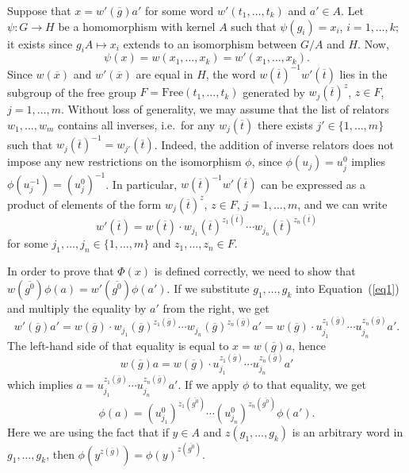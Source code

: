 \documentclass{article}
\begin{document}
Suppose that \( x = w'(\overline{g})a' \) for some word \( w'(t_1, \dots, t_k) \) and \( a' \in A \).
Let \( \psi : G \to H \) be a homomorphism with kernel \( A \) such that \( \psi(g_i) = x_i \), \( i = 1, \dots, k \);
it exists since \( g_iA \mapsto x_i \) extends to an isomorphism between \( G/A \) and \( H \). Now,
\[ \psi(x) = w(x_1, \dots, x_k) = w'(x_1, \dots, x_k). \]
Since \( w(\overline{x}) \) and \( w'(\overline{x}) \) are equal in \( H \), the word \( w(\overline{t})^{-1}w'(\overline{t}) \)
lies in the subgroup of the free group \( F = \mathrm{Free}(t_1, \dots, t_k) \) generated by \( w_j(\overline{t})^z \), \( z \in F \), \( j = 1, \dots, m \).
Without loss of generality, we may assume that the list of relators \( w_1, \dots, w_m \) contains all inverses, i.e.\ for any \( w_j(\overline{t}) \)
there exists \( j' \in \{ 1, \dots, m \} \) such that \( w_j(\overline{t})^{-1} = w_{j'}(\overline{t}) \). Indeed, the addition of inverse
relators does not impose any new restrictions on the isomorphism \( \phi \), since \( \phi(u_j) = u_j^0 \) implies \( \phi(u_j^{-1}) = (u_j^0)^{-1} \).
In particular, \( w(\overline{t})^{-1}w'(\overline{t}) \) can be expressed as a product of elements of the form
\( w_j(\overline{t})^z \), \( z \in F \), \( j = 1, \dots, m \), and we can write
\begin{equation}\label{eq1}
	w'(\overline{t}) = w(\overline{t}) \cdot w_{j_1}(\overline{t})^{z_1(\overline{t})} \cdots w_{j_n}(\overline{t})^{z_n(\overline{t})}
\end{equation}
for some \( j_1, \dots, j_n \in \{ 1, \dots, m \} \) and \( z_1, \dots, z_n \in F \).

In order to prove that \( \Phi(x) \) is defined correctly, we need to show that \( w(\overline{g^0})\phi(a) = w'(\overline{g^0})\phi(a') \).
If we substitute \( g_1, \dots, g_k \) into Equation~(\ref{eq1}) and multiply the equality by \( a' \) from the right, we get
\[ w'(\overline{g})a' = w(\overline{g}) \cdot w_{j_1}(\overline{g})^{z_1(\overline{g})} \cdots w_{j_n}(\overline{g})^{z_n(\overline{g})}a' =
	w(\overline{g}) \cdot u_{j_1}^{z_1(\overline{g})} \cdots u_{j_n}^{z_n(\overline{g})}a'.  \]
The left-hand side of that equality is equal to \( x = w(\overline{g})a \), hence
\[ w(\overline{g})a = w(\overline{g}) \cdot u_{j_1}^{z_1(\overline{g})} \cdots u_{j_n}^{z_n(\overline{g})}a' \]
which implies \( a = u_{j_1}^{z_1(\overline{g})} \cdots u_{j_n}^{z_n(\overline{g})}a' \). If we apply \( \phi \) to that equality, we get
\begin{equation}\label{eq2}
	\phi(a) = (u^0_{j_1})^{z_1(\overline{g^0})} \cdots (u^0_{j_n})^{z_n(\overline{g^0})}\phi(a').
\end{equation}
Here we are using the fact that if \( y \in A \) and \( z(g_1, \dots, g_k) \) is an arbitrary word in \( g_1, \dots, g_k \),
then \( \phi(y^{z(\overline{g})}) = \phi(y)^{z(\overline{g^0})} \).
\end{document}
